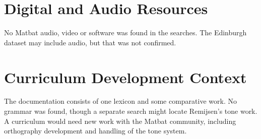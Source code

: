 \documentclass[12pt]{article}
\begin{document}
\section{Digital and Audio Resources}
No Matbat audio, video or software was found in the searches. The Edinburgh dataset may include audio, but that was not confirmed.

\section{Curriculum Development Context}
The documentation consists of one lexicon and some comparative work. No grammar was found, though a separate search might locate Remijsen's tone work. A curriculum would need new work with the Matbat community, including orthography development and handling of the tone system.
\end{document}
